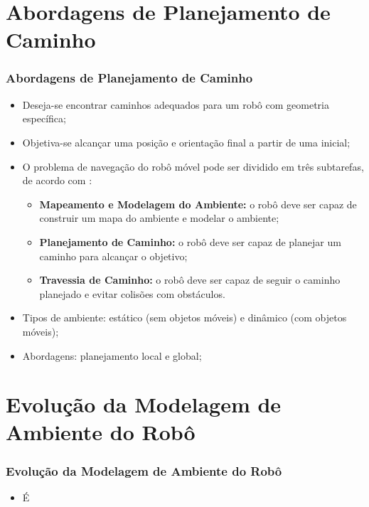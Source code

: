 \documentclass[xcolor=dvipsnames, aspectratio=169]{beamer}
\begin{document}
\section{Abordagens de Planejamento de Caminho}
\begin{frame}
  \frametitle{Abordagens de Planejamento de Caminho}
  \begin{itemize}
    \item Deseja-se encontrar caminhos adequados para um robô com geometria específica;
    \item Objetiva-se alcançar uma posição e orientação final a partir de uma inicial;
    \item O problema de navegação do robô móvel pode ser dividido em três subtarefas, de acordo com \cite{buniyamin2011simple}: 
    \begin{itemize}
      \item \textbf{Mapeamento e Modelagem do Ambiente:} o robô deve ser capaz de construir um mapa do ambiente e modelar o ambiente;
      \item \textbf{Planejamento de Caminho:} o robô deve ser capaz de planejar um caminho para alcançar o objetivo;
      \item \textbf{Travessia de Caminho:} o robô deve ser capaz de seguir o caminho planejado e evitar colisões com obstáculos.
    \end{itemize}
    \item Tipos de ambiente: estático (sem objetos móveis) e dinâmico (com objetos móveis);
    \item Abordagens: planejamento local e global;
  \end{itemize}
  
\end{frame}

\section{Evolução da Modelagem de Ambiente do Robô}
\begin{frame}
  \frametitle{Evolução da Modelagem de Ambiente do Robô}
  \begin{itemize}
    \item É
  \end{itemize}
  
\end{frame}
\end{document}
